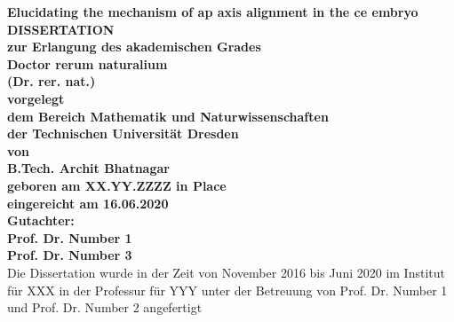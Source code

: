 \documentclass[
    BCOR=6mm,
    DIV=13,
    draft=false,
    titlepage=true,
    twoside=false,
    toc=bib,
    parskip=half-,
    chapterprefix=true,
    appendixprefix=true,
    footnotes=multiple,
    headsepline=true]{scrreprt}
\begin{document}

\begin{titlepage}
\vspace{1cm} 
\begin{center} 
    \Huge \textbf{Elucidating the mechanism of \acs{ap} axis alignment in the \acs{ce} embryo} \vspace{1cm}\\
    \Large \textbf{DISSERTATION \vspace{0.5cm}\\zur Erlangung des akademischen Grades \vspace{0.5cm}\\Doctor rerum naturalium \\(Dr. rer. nat.) \vspace{0.5cm}\\
    vorgelegt \vspace{0.5cm}\\dem Bereich Mathematik und Naturwissenschaften \\ der Technischen Universität Dresden\vspace{0.3cm} \\ von \vspace{0.3cm}\\
    B.Tech. Archit Bhatnagar \vspace{0.5cm}\\ geboren am XX.YY.ZZZZ in Place \vspace{0.5cm}\\ eingereicht am 16.06.2020\vspace{5mm}\\
    Gutachter:\\ Prof. Dr. Number 1\\ Prof. Dr. Number 3} \vspace{0.8cm}\\
    Die Dissertation wurde in der Zeit von November 2016 bis Juni 2020 im Institut f\"ur XXX in der Professur f\"ur YYY unter der Betreuung von Prof. Dr. Number 1 und Prof. Dr. Number 2 angefertigt 
\end{center}
\clearpage
\thispagestyle{plain}
\hspace{\fill}{\huge To my parents and sister...}
\vspace*{\fill}
\end{titlepage}
\end{document}
